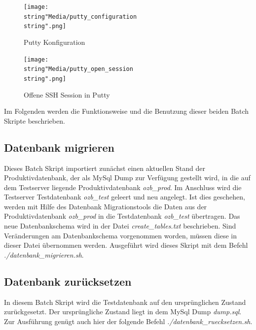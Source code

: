 \documentclass[12pt,             %
               a4paper,          %
               listof=totoc,     %
               index=totoc,      %
               bibliography=totoc,%
               oneside,         %
               BCOR1cm,          %
               english   %
               ]{scrbook}
\begin{document}
\begin{figure}[H]
     \begin{center}
          \texttt{[image: \\string"Media/putty\_configuration\\string".png]}
     \end{center}
     \caption{Putty Konfiguration}
     \label{fig:putty_config}
\end{figure} 

\begin{figure}[H]
     \begin{center}
          \texttt{[image: \\string"Media/putty\_open\_session\\string".png]}
     \end{center}
     \caption{Offene SSH Session in Putty}
     \label{fig:putty_open_session}
\end{figure} 

Im Folgenden werden die Funktionsweise und die Benutzung dieser beiden Batch Skripte beschrieben. 

\subsection{Datenbank migrieren}
Dieses Batch Skript importiert zunächst einen aktuellen Stand der Produktivdatenbank, der als MySql Dump zur Verfügung gestellt wird, in die auf dem Testserver liegende Produktivdatenbank \textit{ozb\_prod}. Im Anschluss wird die Testserver Testdatenbank \textit{ozb\_test} geleert und neu angelegt. Ist dies geschehen, werden mit Hilfe des Datenbank Migrationstools die Daten aus der Produktivdatenbank \textit{ozb\_prod} in die Testdatenbank \textit{ozb\_test} übertragen. Das neue Datenbankschema wird in der Datei \textit{create\_tables.txt} beschrieben. Sind Veränderungen am Datenbankschema vorgenommen worden, müssen diese in dieser Datei übernommen werden. Ausgeführt wird dieses Skript mit dem Befehl \textit{./datenbank\_migrieren.sh}.\\



\subsection{Datenbank zurücksetzen}
In diesem Batch Skript wird die Testdatenbank auf den ursprünglichen Zustand zurückgesetzt. Der ursprüngliche Zustand liegt in dem MySql Dump \textit{dump.sql}. Zur Ausführung genügt auch hier der folgende Befehl \textit{./datenbank\_ruecksetzen.sh}. \\
\end{document}
